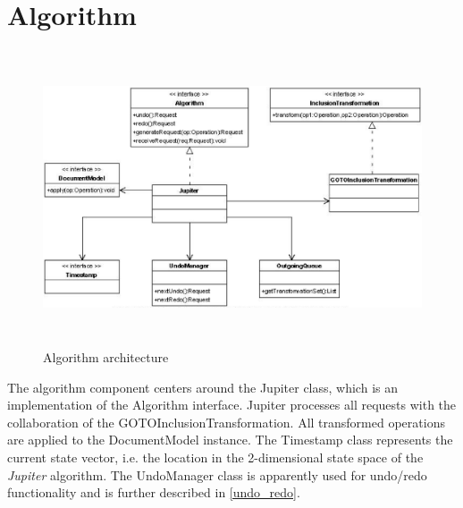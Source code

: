 \section{Algorithm}
\begin{figure}[H]
\centering
\includegraphics[height=8.74cm,width=14.95cm]{../../images/algo-impl/algorithm_diagram.eps}
\caption{Algorithm architecture}
\label{Algorithm architecture}
\end{figure}

The algorithm component centers around the Jupiter class, which is an implementation of the Algorithm interface. Jupiter processes all requests with the collaboration of the GOTOInclusionTransformation. All transformed operations are applied to the DocumentModel instance. The Timestamp class represents the current state vector, i.e. the location in the 2-dimensional state space of the \emph{Jupiter} algorithm. The UndoManager class is apparently used for undo/redo functionality and is further described in \ref{undo_redo}.


